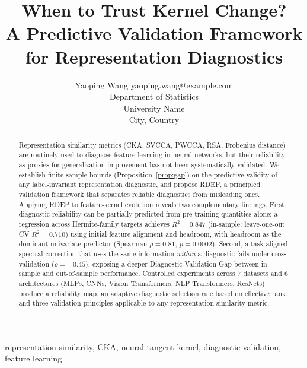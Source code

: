 \documentclass[twoside,11pt]{article}
\begin{document}
\title{When to Trust Kernel Change?\\A Predictive Validation Framework for Representation Diagnostics}

\author{\name Yaoping Wang \email yaoping.wang@example.com \\
       \addr Department of Statistics\\
       University Name\\
       City, Country}


\maketitle

\begin{abstract}
Representation similarity metrics (CKA, SVCCA, PWCCA, RSA, Frobenius distance) are routinely used to diagnose feature learning in neural networks, but their reliability as proxies for generalization improvement has not been systematically validated. We establish finite-sample bounds (Proposition~\ref{prop:gap}) on the predictive validity of any label-invariant representation diagnostic, and propose RDEP, a principled validation framework that separates reliable diagnostics from misleading ones. Applying RDEP to feature-kernel evolution reveals two complementary findings. First, diagnostic reliability can be partially predicted from pre-training quantities alone: a regression across Hermite-family targets achieves $R^2=0.847$ (in-sample; leave-one-out CV $R^2=0.710$) using initial feature alignment and headroom, with headroom as the dominant univariate predictor (Spearman $\rho=0.81$, $p=0.0002$). Second, a task-aligned spectral correction that uses the same information \emph{within} a diagnostic fails under cross-validation ($\rho=-0.45$), exposing a deeper Diagnostic Validation Gap between in-sample and out-of-sample performance. Controlled experiments across 7 datasets and 6 architectures (MLPs, CNNs, Vision Transformers, NLP Transformers, ResNets) produce a reliability map, an adaptive diagnostic selection rule based on effective rank, and three validation principles applicable to any representation similarity metric.
\end{abstract}

\begin{keywords}
representation similarity, CKA, neural tangent kernel, diagnostic validation, feature learning
\end{keywords}
\end{document}
